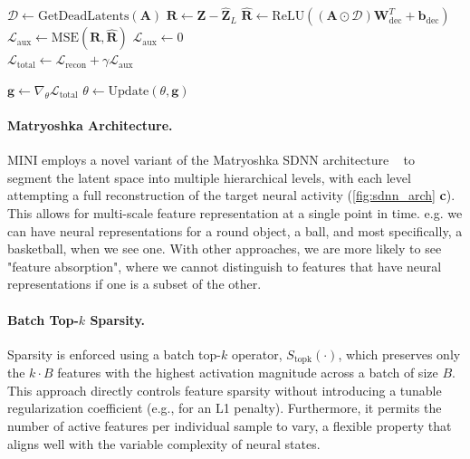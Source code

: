 \begin{algorithm}[h!]
\begin{algorithmic}[1]
    \Statex {}
    \State $\mathcal{D} \gets \text{GetDeadLatents}(\mathbf{A})$
     
        \State $\mathbf{R} \gets \mathbf{Z} - \hat{\mathbf{Z}}_L$ 
        \State $\hat{\mathbf{R}} \gets \text{ReLU}((\mathbf{A} \odot \mathcal{D}) \mathbf{W}_{\text{dec}}^T + \mathbf{b}_{\text{dec}})$ 
        \State $\mathcal{L}_{\text{aux}} \gets \text{MSE}(\mathbf{R}, \hat{\mathbf{R}})$ 
    \Else
        \State $\mathcal{L}_{\text{aux}} \gets 0$
    \EndIf
    \\
    \State $\mathcal{L}_{\text{total}} \gets \mathcal{L}_{\text{recon}} + \gamma \mathcal{L}_{\text{aux}}$ 

    \Statex {}
    \State $\mathbf{g} \gets \nabla_{\theta} \mathcal{L}_{\text{total}}$ 
    \State $\theta \gets \text{Update}(\theta, \mathbf{g})$ 
\EndProcedure
\end{algorithmic}
\end{algorithm}

\paragraph{Matryoshka Architecture.}
MINI employs a novel variant of the Matryoshka SDNN architecture ~\cite{bussmann_2025_msae} to segment the latent space into multiple hierarchical levels, with each level attempting a full reconstruction of the target neural activity (\autoref{fig:sdnn_arch} \textbf{c}). This allows for multi-scale feature representation at a single point in time. e.g. we can have neural representations for a round object, a ball, and most specifically, a basketball, when we see one. With other approaches, we are more likely to see "feature absorption", where we cannot distinguish to features that have neural representations if one is a subset of the other.

\paragraph{Batch Top-$k$ Sparsity.}
Sparsity is enforced using a batch top-$k$ operator, $S_{\text{topk}}(\cdot)$, which preserves only the $k \cdot B$ features with the highest activation magnitude across a batch of size $B$. This approach directly controls feature sparsity without introducing a tunable regularization coefficient (e.g., for an L1 penalty). Furthermore, it permits the number of active features per individual sample to vary, a flexible property that aligns well with the variable complexity of neural states.

